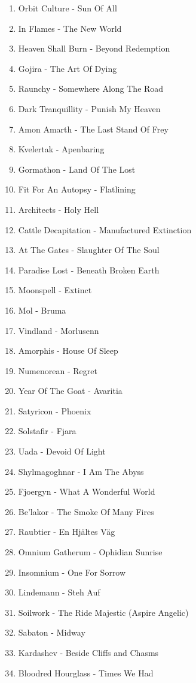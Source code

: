 \begin{enumerate}
	\item Orbit Culture - Sun Of All
	\item In Flames - The New World
	\item Heaven Shall Burn - Beyond Redemption
	\item Gojira - The Art Of Dying
	\item Raunchy - Somewhere Along The Road
	\item Dark Tranquillity - Punish My Heaven
	\item Amon Amarth - The Last Stand Of Frey
	\item Kvelertak - Apenbaring
	\item Gormathon - Land Of The Lost
	\item Fit For An Autopsy - Flatlining
	\item Architects - Holy Hell
	\item Cattle Decapitation - Manufactured Extinction
	\item At The Gates - Slaughter Of The Soul
	\item Paradise Lost - Beneath Broken Earth
	\item Moonspell - Extinct
	\item Mol - Bruma
	\item Vindland - Morlusenn
	\item Amorphis - House Of Sleep
	\item Numenorean - Regret
	\item Year Of The Goat - Avaritia
	\item Satyricon - Phoenix
	\item Solstafir - Fjara
	\item Uada - Devoid Of Light
	\item Shylmagoghnar - I Am The Abyss
	\item Fjoergyn - What A Wonderful World
	\item Be'lakor - The Smoke Of Many Fires
	\item Raubtier - En Hjältes Väg
	\item Omnium Gatherum - Ophidian Sunrise
	\item Insomnium - One For Sorrow
	\item Lindemann - Steh Auf
	\item Soilwork - The Ride Majestic (Aspire Angelic)
	\item Sabaton - Midway
	\item Kardashev - Beside Cliffs and Chasms
	\item Bloodred Hourglass - Times We Had

\end{enumerate}
